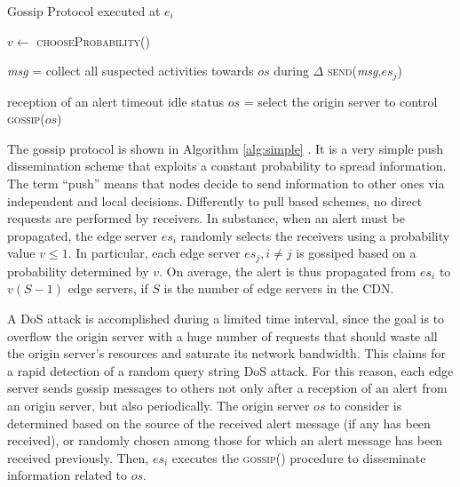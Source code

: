 \documentclass{IEEEtran}
\begin{document}
\begin{algorithm}[t]
\caption{Gossip Protocol executed at $e_i$} \label{alg:simple}
\begin{algorithmic}
\STATE $\mathit{v} \gets$ \textsc{chooseProbability()} \STATE

\STATE \emph{msg} = collect all suspected activities towards $os$ during $\Delta$   \STATE \textsc{send}(\emph{msg},$\mathit{es_j}$)\ENDIF \ENDFOR
\STATE

 reception of an alert \OR timeout idle status
\STATE $os$ = select the origin server to control
\STATE \textsc{gossip}($os$)
\end{algorithmic}
\end{algorithm}

The gossip protocol is shown in Algorithm \ref{alg:simple} \cite{simutools}. It is a very simple push dissemination scheme that exploits a constant probability to spread information. The term ``push'' means that nodes decide to send information to other ones via independent and local decisions. Differently to pull based schemes, no direct requests are performed by receivers.
In substance, when an alert must be propagated, the edge server $es_i$ randomly selects the receivers using a probability value $\mathit{v} \leq 1$. In particular, each edge server $es_j, i\neq j$ is gossiped based on a probability determined by $\mathit{v}$. On average, the alert is thus propagated from $es_i$ to $\mathit{v} (S-1)$ edge servers, if $S$ is the number of edge servers in the CDN.

A DoS attack is accomplished during a limited time interval, since the goal is to overflow the origin server with a huge number of requests that should waste all the origin server's resources and saturate its network bandwidth. This claims for a rapid detection of a random query string DoS attack. For this reason, each edge server sends gossip messages to others not only after a reception of an alert from an origin server, but also periodically. The origin server $os$ to consider is determined based on the source of the received alert message (if any has been received), or randomly chosen among those for which an alert message has been received previously. Then, $es_i$ executes the \textsc{gossip}() procedure to disseminate information related to $os$. 
\end{document}
